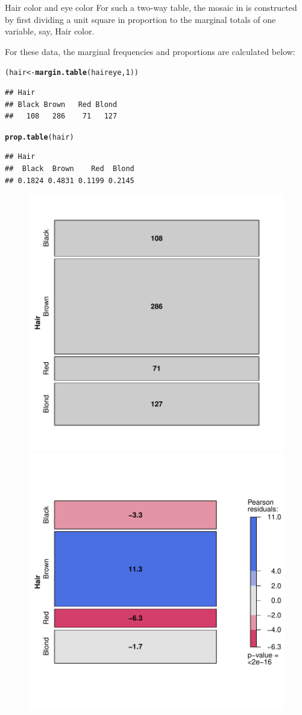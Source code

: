 \documentclass[11pt]{book}\usepackage[]{graphicx}\usepackage[]{color}
\makeatletter
\newcommand{\hlnum}[1]{\textcolor[rgb]{0.686,0.059,0.569}{#1}}%
\newcommand{\hlstd}[1]{\textcolor[rgb]{0.345,0.345,0.345}{#1}}%
\newcommand{\hlkwb}[1]{\textcolor[rgb]{0.69,0.353,0.396}{#1}}%
\newcommand{\hlkwd}[1]{\textcolor[rgb]{0.737,0.353,0.396}{\textbf{#1}}}%
\newenvironment{kframe}{%
 \def\at@end@of@kframe{}%
 \ifinner\ifhmode%
  \def\at@end@of@kframe{\end{minipage}}%
  \begin{minipage}{\columnwidth}%
 \fi\fi%
 \def\FrameCommand##1{\hskip\@totalleftmargin \hskip-\fboxsep
 \colorbox{shadecolor}{##1}\hskip-\fboxsep
     \hskip-\linewidth \hskip-\@totalleftmargin \hskip\columnwidth}%
 \MakeFramed {\advance\hsize-\width
   \@totalleftmargin\z@ \linewidth\hsize
   \@setminipage}}%
 {\par\unskip\endMakeFramed%
 \at@end@of@kframe}
\newenvironment{knitrout}{}{} %
\renewenvironment{knitrout}{\small\renewcommand{\baselinestretch}{.85}}{} %
\makeatother
\begin{document}
\begin{Example}[haireye2a]{Hair color and eye color}
For such a two-way table, the mosaic in  is constructed
by first dividing a unit square in proportion to the marginal
totals of one variable, say, Hair color.

For these data, the marginal frequencies and proportions are calculated below:
\begin{knitrout}
\color{fgcolor}\begin{kframe}
\begin{alltt}
\hlstd{(hair} \hlkwb{<-} \hlkwd{margin.table}\hlstd{(haireye,}\hlnum{1}\hlstd{))}
\end{alltt}
\begin{verbatim}
## Hair
## Black Brown   Red Blond 
##   108   286    71   127
\end{verbatim}
\begin{alltt}
\hlkwd{prop.table}\hlstd{(hair)}
\end{alltt}
\begin{verbatim}
## Hair
##  Black  Brown    Red  Blond 
## 0.1824 0.4831 0.1199 0.2145
\end{verbatim}
\end{kframe}
\end{knitrout}


\begin{knitrout}
\color{fgcolor}\begin{figure}[htbp]


\centerline{\includegraphics[width=.49\textwidth]{ch05/fig/haireye-mos41} 
\includegraphics[width=.49\textwidth]{ch05/fig/haireye-mos42} }


\end{figure}
\end{knitrout}
\end{Example}
\end{document}
